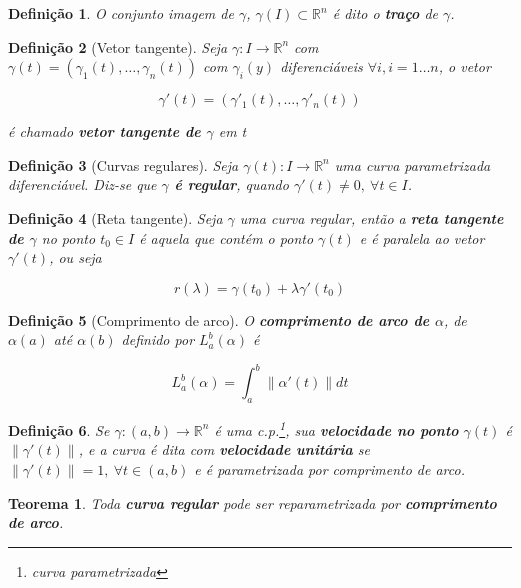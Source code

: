 \documentclass{article}
\newtheorem{theorem}{Teorema}
\newtheorem{definition}{Definição}
\begin{document}
\begin{definition}
O conjunto imagem de $\gamma$, $\gamma(I) \subset \mathbb{R}^n$ é dito o \textbf{traço} de $\gamma$.
\end{definition}

\begin{definition}[Vetor tangente]
Seja $\gamma: I \rightarrow \mathbb{R}^n$ com $\gamma(t) = (\gamma_1 (t), \ldots, \gamma_n (t))$ com $\gamma_i (y)$ diferenciáveis $\forall i, i = 1 \ldots n$, o vetor

$$\gamma'(t) = (\gamma'_1 (t), \ldots, \gamma'_n (t))$$

é chamado \textbf{vetor tangente de $\gamma$} em t
\end{definition}

\begin{definition}[Curvas regulares]
Seja $\gamma (t): I \rightarrow \mathbb{R}^n$ uma curva parametrizada diferenciável. Diz-se que \textbf{$\gamma$ é regular}, quando $\gamma'(t) \neq 0,\ \forall t \in I$. 
\end{definition}

\begin{definition}[Reta tangente]
Seja $\gamma$ uma curva regular, então a \textbf{reta tangente de $\gamma$} no ponto $t_0 \in I$ é aquela que contém o ponto $\gamma(t)$ e é paralela ao vetor $\gamma'(t)$, ou seja

$$r(\lambda) = \gamma(t_0) + \lambda \gamma'(t_0)$$
\end{definition}

\begin{definition}[Comprimento de arco]
O \textbf{comprimento de arco de $\alpha$}, de $\alpha(a)$ até $\alpha(b)$ definido por $L_a^b (\alpha)$ é  

$$L_a^b (\alpha) = \int_a^b \| \alpha'(t) \| d t$$
\end{definition}

\begin{definition}
Se $\gamma: (a, b) \rightarrow \mathbb{R}^n$ é uma c.p.\footnote{curva parametrizada}, sua \textbf{velocidade no ponto} $\gamma(t)$ é $\| \gamma'(t) \|$, e a curva é dita com \textbf{velocidade unitária} se $\| \gamma'(t) \| = 1,\ \forall t \in (a, b)$ e é parametrizada por comprimento de arco.
\end{definition}

\begin{theorem}
Toda \textbf{curva regular} pode ser reparametrizada por \textbf{comprimento de arco}.
\end{theorem}
\end{document}
